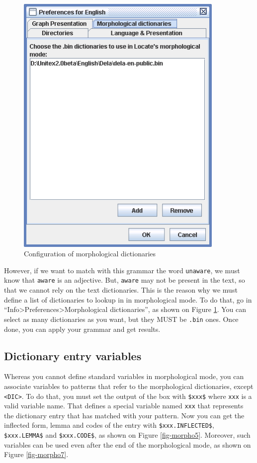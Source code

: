 \begin{figure}[!ht]
\begin{center}
\includegraphics[width=10cm]{resources/img/fig6-17n.png}
\caption{Configuration of morphological dictionaries\label{fig-morpho4}}
\end{center}
\end{figure}

\bigskip
\noindent However, if we want to match with this grammar the word 
\verb+unaware+, we must know that \verb+aware+ is an adjective. But,
\verb+aware+ may not be present in the text, so that we cannot rely on the text
dictionaries. This is the reason why we must define a list of dictionaries
to lookup in in morphological mode. To do that, go in
``Info>Preferences>Morphological dictionaries'', as shown on Figure
\ref{fig-morpho4}. You can select as many dictionaries as you want, but they
MUST be \verb+.bin+ ones. Once done, you can apply your grammar and get results.

\subsection{Dictionary entry variables}
Whereas you cannot define standard variables in morphological mode, you can
associate variables to patterns that refer to the morphological dictionaries,
except \verb+<DIC>+. To do that, you must set the output of the box with
\verb+$xxx$+ where \verb+xxx+ is a valid variable name. That defines a
special variable named \verb+xxx+ that represents the dictionary entry that has
matched with your pattern. Now you can get the inflected form, lemma and codes
of the entry with \verb+$xxx.INFLECTED$+, \verb+$xxx.LEMMA$+ and
\verb+$xxx.CODE$+, as shown on Figure \ref{fig-morpho5}. Moreover, such
variables can be used even after the end of the morphological mode, as shown on Figure
\ref{fig-morpho7}.
 
